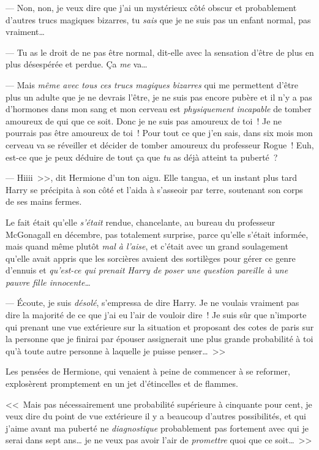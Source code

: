 --- Non, non, je veux dire que j'ai un mystérieux côté obscur et probablement d'autres trucs magiques bizarres, tu \emph{sais} que je ne suis pas un enfant normal, pas vraiment…

--- Tu as le droit de ne pas être normal, dit-elle avec la sensation d'être de plus en plus désespérée et perdue. Ça \emph{me} va…

--- Mais \emph{même avec tous ces trucs magiques bizarres} qui me permettent d'être plus un adulte que je ne devrais l'être, je ne suis pas encore pubère et il n'y a pas d'hormones dans mon sang et mon cerveau est \emph{physiquement incapable} de tomber amoureux de qui que ce soit. Donc je ne suis pas amoureux de toi~! Je ne pourrais pas être amoureux de toi~! Pour tout ce que j'en sais, dans six mois mon cerveau va se réveiller et décider de tomber amoureux du professeur Rogue~! Euh, est-ce que je peux déduire de tout ça que \emph{tu} as déjà atteint ta puberté~?

--- Hiiii~>>, dit Hermione d'un ton aigu. Elle tangua, et un instant plus tard Harry se précipita à son côté et l'aida à s'asseoir par terre, soutenant son corps de ses mains fermes.

Le fait était qu'elle \emph{s'était} rendue, chancelante, au bureau du professeur McGonagall en décembre, pas totalement surprise, parce qu'elle s'était informée, mais quand même plutôt \emph{mal à l'aise}, et c'était avec un grand soulagement qu'elle avait appris que les sorcières avaient des sortilèges pour gérer ce genre d'ennuis et \emph{qu'est-ce qui prenait Harry de poser une question pareille à une pauvre fille innocente…}

--- Écoute, je suis \emph{désolé}, s'empressa de dire Harry. Je ne voulais vraiment pas dire la majorité de ce que j'ai eu l'air de vouloir dire~! Je suis sûr que n'importe qui prenant une vue extérieure sur la situation et proposant des cotes de paris sur la personne que je finirai par épouser assignerait une plus grande probabilité à toi qu'à toute autre personne à laquelle je puisse penser…~>>

Les pensées de Hermione, qui venaient à peine de commencer à se reformer, explosèrent promptement en un jet d'étincelles et de flammes.

<<~Mais pas nécessairement une probabilité supérieure à cinquante pour cent, je veux dire du point de vue extérieure il y a beaucoup d'autres possibilités, et qui j'aime avant ma puberté ne \emph{diagnostique} probablement pas fortement avec qui je serai dans sept ans… je ne veux pas avoir l'air de \emph{promettre} quoi que ce soit…~>>

